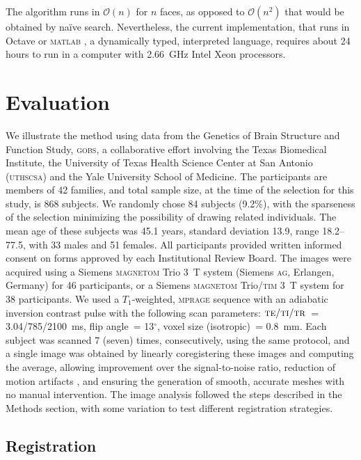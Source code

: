 The algorithm runs in $\mathcal{O}(n)$ for $n$ faces, as opposed to $\mathcal{O}(n^2)$ that would be obtained by na\"ive search. Nevertheless, the current implementation, that runs in Octave \citep{Eaton2015} or \textsc{matlab} \citep{MATLAB2015}, a dynamically typed, interpreted language, requires about 24 hours to run in a computer with 2.66~GHz Intel Xeon processors.


\section{Evaluation}

We illustrate the method using data from the Genetics of Brain Structure and Function Study, \textsc{gobs}, a collaborative effort involving the Texas Biomedical Institute, the University of Texas Health Science Center at San Antonio (\textsc{uthscsa}) and the Yale University School of Medicine. The participants are members of 42 families, and total sample size, at the time of the selection for this study, is 868 subjects. We randomly chose 84 subjects (9.2\%), with the sparseness of the selection minimizing the possibility of drawing related individuals. The mean age of these subjects was 45.1 years, standard deviation 13.9, range 18.2--77.5, with 33 males and 51 females. All participants provided written informed consent on forms approved by each Institutional Review Board. The images were acquired using a Siemens \textsc{magnetom} Trio 3~T system (Siemens \textsc{ag}, Erlangen, Germany) for 46 participants, or a Siemens \textsc{magnetom} Trio/\textsc{tim} 3~T system for 38 participants. We used a $T_1$-weighted, \textsc{mprage} sequence with an adiabatic inversion contrast pulse with the following scan parameters: $\textsc{te}/\textsc{ti}/\textsc{tr}$~= 3.04/785/2100~ms, flip angle~= 13$^{\circ}$, voxel size (isotropic)~= 0.8~mm. Each subject was scanned 7 (seven) times, consecutively, using the same protocol, and a single image was obtained by linearly coregistering these images and computing the average, allowing improvement over the signal-to-noise ratio, reduction of motion artifacts \citep{Kochunov2006}, and ensuring the generation of smooth, accurate meshes with no manual intervention. The image analysis followed the steps described in the Methods section, with some variation to test different registration strategies.

\subsection{Registration}

